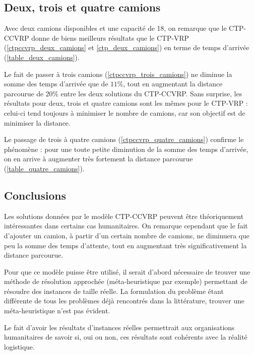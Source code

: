 \documentclass[5p,authoryear,square]{elsarticle}
\begin{document}
\subsection{Deux, trois et quatre camions}
Avec deux camions disponibles et une capacité de 18, on remarque que le CTP-CCVRP donne de biens meilleurs résultats que le CTP-VRP (\cref{ctpccvrp_deux_camions} et \cref{ctp_deux_camions}) en terme de temps d'arrivée (\cref{table_deux_camions}).

Le fait de passer à trois camions (\cref{ctpccvrp_trois_camions}) ne diminue la somme des temps d'arrivée que de $11\%$, tout en augmentant la distance parcourue de $20\%$ entre les deux solutions du CTP-CCVRP. Sans surprise, les résultats pour deux, trois et quatre camions sont les mêmes pour le CTP-VRP : celui-ci tend toujours à minimiser le nombre de camions, car son objectif est de minimiser la distance. 

Le passage de trois à quatre camions (\cref{ctpccvrp_quatre_camions}) confirme le phénomène : pour une toute petite diminution de la somme des temps d'arrivée, on en arrive à augmenter très fortement la distance parcourue (\cref{table_quatre_camions}).

\subsection{Conclusions}

Les solutions données par le modèle CTP-CCVRP peuvent être théoriquement intéressantes dans certains cas humanitaires. On remarque cependant que le fait d'ajouter un camion, à partir d'un certain nombre de camions, ne diminuera que peu la somme des temps d'attente, tout en augmentant très significativement la distance parcourue.

Pour que ce modèle puisse être utilisé, il serait d'abord nécessaire de trouver une méthode de résolution approchée (méta-heuristique par exemple) permettant de résoudre des instances de taille réelle. La formulation du problème étant différente de tous les problèmes déjà rencontrés dans la littérature, trouver une méta-heuristique n'est pas évident.

Le fait d'avoir les résultats d'instances réelles permettrait aux organisations humanitaires de savoir si, oui ou non, ces résultats sont cohérents avec la réalité logistique.
\end{document}
